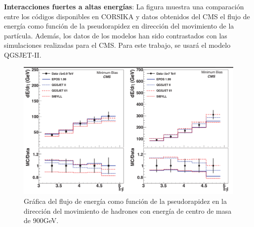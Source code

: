 \textbf{Interacciones fuertes a altas energías}: La figura muestra una comparación entre los códigos disponibles en CORSIKA y datos obtenidos del CMS el flujo de energía como función de la pseudorapidez en dirección del movimiento de la partícula. Además, los datos de los modelos han sido contrastados con las simulaciones realizadas para el CMS. Para este trabajo, se usará el modelo QGSJET-II.\\
\begin{figure}[htb!]
\centering
\includegraphics[width=1\textwidth]{Figs/Hadronic_Model_Comparison_3.png}
\caption[Flujo de energía para hadrones de alta energía]{Gráfica del flujo de energía como función de la pseudorapidez en la dirección del movimiento de hadrones con energía de centro de masa de 900GeV. \citep{Allen} }
        \label{fig:fig5}
\end{figure}

\newpage